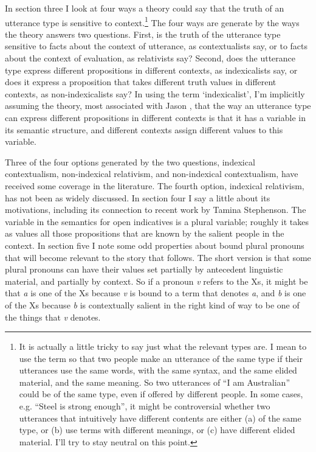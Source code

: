 In section three I look at four ways a theory could say that the truth of an utterance type is sensitive to context.\footnote{ It is actually a little tricky to say just what the relevant types are. I mean to use the term so that two people make an utterance of the same type if their utterances use the same words, with the same syntax, and the same elided material, and the same meaning. So two utterances of ``I am Australian'' could be of the same type, even if offered by different people. In some cases, e.g. ``Steel is strong enough'', it might be controversial whether two utterances that intuitively have different contents are either (a) of the same type, or (b) use terms with different meanings, or (c) have different elided material. I'll try to stay neutral on this point.} The four ways are generate by the ways the theory answers two questions. First, is the truth of the utterance type sensitive to facts about the context of utterance, as contextualists say, or to facts about the context of evaluation, as relativists say? Second, does the utterance type express different propositions in different contexts, as indexicalists say, or does it express a proposition that takes different truth values in different contexts, as non-indexicalists say? In using the term `indexicalist', I'm implicitly assuming the theory, most associated with Jason \citet{Stanley2007-STALIC} , that the way an utterance type can express different propositions in different contexts is that it has a variable in its semantic structure, and different contexts assign different values to this variable.

Three of the four options generated by the two questions, indexical contextualism, non-indexical relativism, and non-indexical contextualism, have received some coverage in the literature. The fourth option, indexical relativism, has not been as widely discussed. In section four I say a little about its motivations, including its connection to recent work by Tamina Stephenson. The variable in the semantics for open indicatives is a plural variable; roughly it takes as values all those propositions that are known by the salient people in the context. In section five I note some odd properties about bound plural pronouns that will become relevant to the story that follows. The short version is that some plural pronouns can have their values set partially by antecedent linguistic material, and partially by context. So if a pronoun \textit{v} refers to the Xs, it might be that \textit{a} is one of the Xs because \textit{v} is bound to a term that denotes \textit{a}, and \textit{b} is one of the Xs because \textit{b} is contextually salient in the right kind of way to be one of the things that \textit{v} denotes. 

